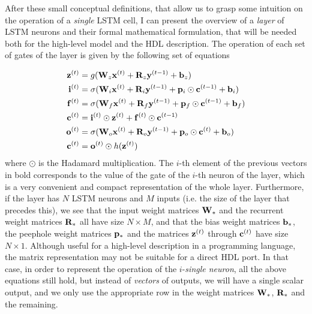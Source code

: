 After these small conceptual definitions, that allow us to grasp some intuition on the operation of a \textit{single} LSTM cell, I can present the overview of a \textit{layer} of LSTM neurons and their formal mathematical formulation, that will be needed both for the high-level model and the HDL description. The operation of each set of gates of the layer is given by the following set of equations

\begin{align}\label{eq:equationsLSTM}
    \mathbf{z}^{(t)} & = g(\mathbf{W}_z \mathbf{x}^{(t)} + \mathbf{R}_z \mathbf{y}^{(t-1)} + \mathbf{b}_z) \\
    \mathbf{i}^{(t)} & = \sigma(\mathbf{W}_i \mathbf{x}^{(t)} + \mathbf{R}_i \mathbf{y}^{(t-1)} + \mathbf{p}_i \odot \mathbf{c}^{(t-1)} + \mathbf{b}_i) \\
    \mathbf{f}^{(t)} & = \sigma(\mathbf{W}_f \mathbf{x}^{(t)} + \mathbf{R}_f \mathbf{y}^{(t-1)} + \mathbf{p}_f \odot \mathbf{c}^{(t-1)} + \mathbf{b}_f) \\
    \mathbf{c}^{(t)} & = \mathbf{i}^{(t)} \odot \mathbf{z}^{(t)} + \mathbf{f}^{(t)} \odot \mathbf{c}^{(t-1)} \\
    \mathbf{o}^{(t)} & = \sigma(\mathbf{W}_o \mathbf{x}^{(t)} + \mathbf{R}_o \mathbf{y}^{(t-1)} + \mathbf{p}_o \odot \mathbf{c}^{(t)} + \mathbf{b}_o) \\
    \mathbf{c}^{(t)} & = \mathbf{o}^{(t)} \odot h(\mathbf{z}^{(t)}) 
\end{align}
where $\odot$ is the Hadamard multiplication. The $i$-th element of the previous vectors in bold corresponds to the value of the gate of the $i$-th neuron of the layer, which is a very convenient and compact representation of the whole layer. Furthermore, if the layer has $N$ LSTM neurons and $M$ inputs (i.e. the size of the layer that precedes this), we see that the input weight matrices $\mathbf{W}_*$ and the  recurrent weight matrices $\mathbf{R}_*$ all have size $N \times M$, and that the bias weight matrices $\mathbf{b}_*$, the peephole weight matrices $\mathbf{p}_*$ and the matrices $\mathbf{z}^{(t)}$ through $\mathbf{c}^{(t)}$ have size $N \times 1$. Although useful for a high-level description in a programming language, the matrix representation  may not be suitable for a direct HDL port. In that case, in order to represent the operation of the $i$-\textit{single neuron}, all the above equations still hold, but instead of \textit{vectors} of outputs, we will have a single scalar output, and we only use the appropriate row in the weight matrices $\mathbf{W}_{*}$, $\mathbf{R}_{*}$ and the remaining.

